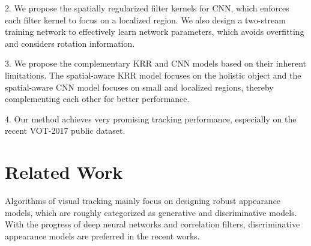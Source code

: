 \documentclass[10pt,twocolumn,letterpaper]{article}
\begin{document}
2. We propose the spatially regularized filter kernels for CNN, which enforces
each filter kernel to focus on a localized region.
We also design a two-stream training network to effectively learn network
parameters, which avoids overfitting and considers rotation information.

3. We propose the complementary KRR and CNN models based on their inherent
limitations. The spatial-aware KRR model focuses on the holistic object and
the spatial-aware CNN model focuses on small and localized regions, thereby
complementing each other for better performance.

4. Our method achieves very promising tracking performance, especially
on the recent VOT-2017 public dataset.




\section{Related Work}
Algorithms of visual tracking mainly focus on designing robust appearance
models, which are roughly categorized as generative and discriminative models.
With the progress of deep neural networks and correlation filters, discriminative
appearance models are preferred in the recent works.
\end{document}
